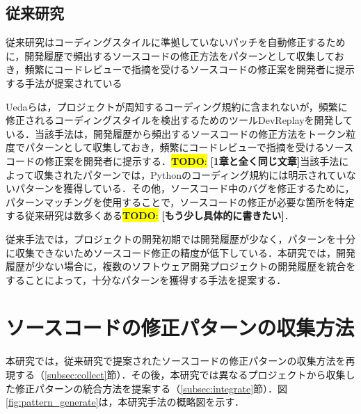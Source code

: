 \documentclass[T,J]{fose} %
\newcommand{\todo}[1]{\colorbox{yellow}{{\bf TODO}:}{\color{red} {\textbf{[#1]}}}}
\begin{document}
\subsection{従来研究}
従来研究はコーディングスタイルに準拠していないパッチを自動修正するために，開発履歴で頻出するソースコードの修正方法をパターンとして収集しておき，頻繁にコードレビューで指摘を受けるソースコードの修正案を開発者に提示する手法が提案されている\cite{AutomaticPatch}\cite{findBugs}\cite{Relntancer}\cite{don'tDIY}

Uedaらは，プロジェクトが周知するコーディング規約に含まれないが，頻繁に修正されるコーディングスタイルを検出するためのツールDevReplayを開発している．当該手法は，開発履歴から頻出するソースコードの修正方法をトークン粒度でパターンとして収集しておき，頻繁にコードレビューで指摘を受けるソースコードの修正案を開発者に提示する\cite{devreplay}．\todo{1章と全く同じ文章}当該手法によって収集されたパターンでは，Pythonのコーディング規約には明示されていないパターンを獲得している．その他，ソースコード中のバグを修正するために，パターンマッチングを使用することで，ソースコードの修正が必要な箇所を特定する従来研究は数多くある\todo{もう少し具体的に書きたい}．

従来手法では，プロジェクトの開発初期では開発履歴が少なく，パターンを十分に収集できないためソースコード修正の精度が低下している．本研究では，開発履歴が少ない場合に，複数のソフトウェア開発プロジェクトの開発履歴を統合をすることによって，十分なパターンを獲得する手法を提案する．


\section{ソースコードの修正パターンの収集方法}\label{sec:method}

本研究では，従来研究で提案されたソースコードの修正パターンの収集方法を再現する（\ref{subsec:collect}節）．その後，本研究では異なるプロジェクトから収集した修正パターンの統合方法を提案する（\ref{subsec:integrate}節）．図\ref{fig:pattern_generate}は，本研究手法の概略図を示す．
\end{document}
